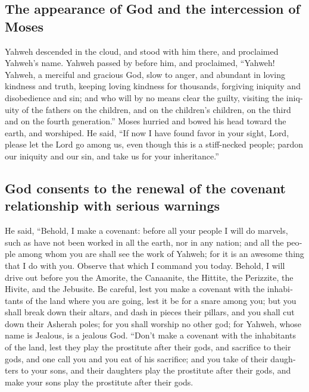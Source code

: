 \begin{paracol}{2}
\begin{otherlanguage}{english}
\hypertarget{the-appearance-of-god-and-the-intercession-of-moses}{%
\subsection{The appearance of God and the intercession of
Moses}\label{the-appearance-of-god-and-the-intercession-of-moses}}

 Yahweh descended in the cloud, and stood with him there,
and proclaimed Yahweh's name.  Yahweh passed by before
him, and proclaimed, ``Yahweh! Yahweh, a merciful and gracious God, slow
to anger, and abundant in loving kindness and truth, 
keeping loving kindness for thousands, forgiving iniquity and
disobedience and sin; and who will by no means clear the guilty,
visiting the iniquity of the fathers on the children, and on the
children's children, on the third and on the fourth generation.''
 Moses hurried and bowed his head toward the earth, and
worshiped.  He said, ``If now I have found favor in your
sight, Lord, please let the Lord go among us, even though this is a
stiff-necked people; pardon our iniquity and our sin, and take us for
your inheritance.''

\hypertarget{god-consents-to-the-renewal-of-the-covenant-relationship-with-serious-warnings}{%
\subsection{God consents to the renewal of the covenant relationship
with serious
warnings}\label{god-consents-to-the-renewal-of-the-covenant-relationship-with-serious-warnings}}

 He said, ``Behold, I make a covenant: before all your
people I will do marvels, such as have not been worked in all the earth,
nor in any nation; and all the people among whom you are shall see the
work of Yahweh; for it is an awesome thing that I do with you.
 Observe that which I command you today. Behold, I will
drive out before you the Amorite, the Canaanite, the Hittite, the
Perizzite, the Hivite, and the Jebusite.  Be careful,
lest you make a covenant with the inhabitants of the land where you are
going, lest it be for a snare among you;  but you shall
break down their altars, and dash in pieces their pillars, and you shall
cut down their Asherah poles;  for you shall worship no
other god; for Yahweh, whose name is Jealous, is a jealous God.
 ``Don't make a covenant with the inhabitants of the
land, lest they play the prostitute after their gods, and sacrifice to
their gods, and one call you and you eat of his sacrifice;
 and you take of their daughters to your sons, and their
daughters play the prostitute after their gods, and make your sons play
the prostitute after their gods.


\end{otherlanguage}
\end{paracol}
